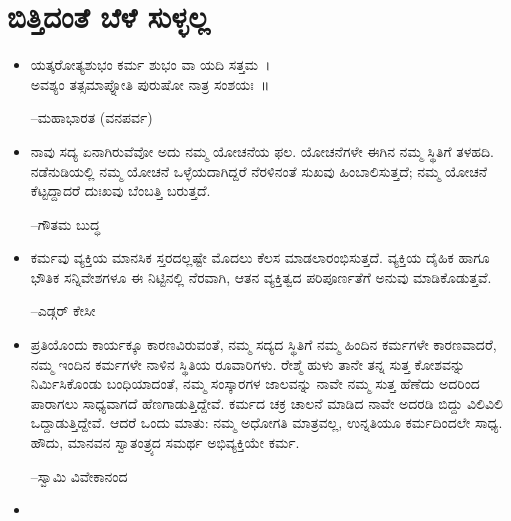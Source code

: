 
\chapter{ಬಿತ್ತಿದಂತೆ ಬೆಳೆ ಸುಳ್ಳಲ್ಲ}

\begin{itemize}
\item ಯತ್ಕರೋತ್ಯಶುಭಂ ಕರ್ಮ ಶುಭಂ ವಾ ಯದಿ ಸತ್ತಮ~।\\ಅವಶ್ಯಂ ತತ್ಸಮಾಪ್ನೋತಿ ಪುರುಷೋ ನಾತ್ರ ಸಂಶಯಃ~॥\\
\begin{flushright}
–ಮಹಾಭಾರತ (ವನಪರ್ವ)
\end{flushright}

 \item ನಾವು ಸದ್ಯ ಏನಾಗಿರುವೆವೋ ಅದು ನಮ್ಮ ಯೋಚನೆಯ ಫಲ. ಯೋಚನೆಗಳೇ ಈಗಿನ ನಮ್ಮ ಸ್ಥಿತಿಗೆ ತಳಹದಿ. ನಡೆನುಡಿಯಲ್ಲಿ ನಮ್ಮ ಯೋಚನೆ ಒಳ್ಳೆಯದಾಗಿದ್ದರೆ ನೆರಳಿನಂತೆ ಸುಖವು ಹಿಂಬಾಲಿಸುತ್ತದೆ; ನಮ್ಮ ಯೋಚನೆ ಕೆಟ್ಟದ್ದಾದರೆ ದುಃಖವು ಬೆಂಬತ್ತಿ ಬರುತ್ತದೆ.\\
\begin{flushright}
–ಗೌತಮ ಬುದ್ಧ
\end{flushright}

 \item ಕರ್ಮವು ವ್ಯಕ್ತಿಯ ಮಾನಸಿಕ ಸ್ತರದಲ್ಲಷ್ಟೇ ಮೊದಲು ಕೆಲಸ ಮಾಡಲಾರಂಭಿಸುತ್ತದೆ. ವ್ಯಕ್ತಿಯ ದೈಹಿಕ ಹಾಗೂ ಭೌತಿಕ ಸನ್ನಿವೇಶಗಳೂ ಈ ನಿಟ್ಟಿನಲ್ಲಿ ನೆರವಾಗಿ, ಆತನ ವ್ಯಕ್ತಿತ್ವದ ಪರಿಪೂರ್ಣತೆಗೆ ಅನುವು ಮಾಡಿಕೊಡುತ್ತವೆ.\\
\begin{flushright}
–ಎಡ್ಗರ್ ಕೇಸೀ
\end{flushright}

 \item ಪ್ರತಿಯೊಂದು ಕಾರ್ಯಕ್ಕೂ ಕಾರಣವಿರುವಂತೆ, ನಮ್ಮ ಸದ್ಯದ ಸ್ಥಿತಿಗೆ ನಮ್ಮ ಹಿಂದಿನ ಕರ್ಮಗಳೇ ಕಾರಣವಾದರೆ, ನಮ್ಮ ಇಂದಿನ ಕರ್ಮಗಳೇ ನಾಳಿನ ಸ್ಥಿತಿಯ ರೂವಾರಿಗಳು. ರೇಶ್ಮೆ ಹುಳು ತಾನೇ ತನ್ನ ಸುತ್ತ ಕೋಶವನ್ನು ನಿರ್ಮಿಸಿಕೊಂಡು ಬಂಧಿಯಾದಂತೆ, ನಮ್ಮ ಸಂಸ್ಕಾರಗಳ ಜಾಲವನ್ನು ನಾವೇ ನಮ್ಮ ಸುತ್ತ ಹೆಣೆದು ಅದರಿಂದ ಪಾರಾಗಲು ಸಾಧ್ಯವಾಗದೆ ಹೆಣಗಾಡುತ್ತಿದ್ದೇವೆ. ಕರ್ಮದ ಚಕ್ರ ಚಾಲನೆ ಮಾಡಿದ ನಾವೇ ಅದರಡಿ ಬಿದ್ದು ವಿಲಿವಿಲಿ ಒದ್ದಾಡುತ್ತಿದ್ದೇವೆ. ಆದರೆ ಒಂದು ಮಾತು: ನಮ್ಮ ಅಧೋಗತಿ ಮಾತ್ರವಲ್ಲ, ಉನ್ನತಿಯೂ ಕರ್ಮದಿಂದಲೇ ಸಾಧ್ಯ. ಹೌದು, ಮಾನವನ ಸ್ವಾತಂತ್ರ್ಯದ ಸಮರ್ಥ ಅಭಿವ್ಯಕ್ತಿಯೇ ಕರ್ಮ.\\
\begin{flushright}
–ಸ್ವಾಮಿ ವಿವೇಕಾನಂದ
\end{flushright}

 \item {}\\
\begin{flushright}
\end{flushright}


\end{itemize}
